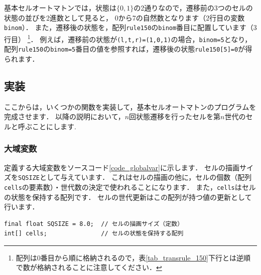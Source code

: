 \documentclass[dvipdfmx]{jsarticle}
\theoremstyle{definition}
\begin{document}
基本セルオートマトンでは，状態は$\{0,1\}$の2通りなので，遷移前の3つのセルの状態の並びを2進数として見ると，
0から7の自然数となります（2行目の変数\verb|binom|）．
また，遷移後の状態を，配列\verb|rule150|の\verb|binom|番目に配置しています（3行目）
\footnote{
    配列は0番目から順に格納されるので，表\ref{tab_transrule_150}下行とは逆順で数が格納されることに注意してください．
}．
%
例えば，遷移前の状態が\verb|(l,t,r)=(1,0,1)|の場合，\verb|binom=5|となり，
配列\verb|rule150|の\verb|binom=5|番目の値を参照すれば，遷移後の状態\verb|rule150[5]=0|が得られます．

\subsection{実装}  \label{subsec_implementation}
ここからは，いくつかの関数を実装して，基本セルオートマトンのプログラムを完成させます．
以降の説明において，$n$回状態遷移を行ったセルを第$n$世代のセルと呼ぶことにします.

\subsubsection{大域変数}  \label{subsubsec_global_var}
定義する大域変数をソースコード\ref{code_globalvar}に示します．
セルの描画サイズを\verb|SQSIZE|として与えています．
これはセルの描画の他に，セルの個数（配列\verb|cells|の要素数）・世代数の決定で使われることになります．
また，\verb|cells|はセルの状態を保持する配列です．
セルの世代更新はこの配列が持つ値の更新として行います．
%
\begin{lstlisting}[caption=大域変数, label=code_globalvar]
final float SQSIZE = 8.0;  // セルの描画サイズ（定数）
int[] cells;               // セルの状態を保持する配列
\end{lstlisting}

\end{document}
